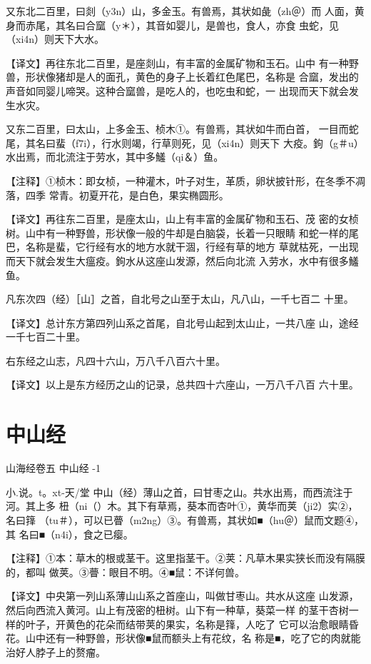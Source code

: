 \documentclass[a4paper,12pt,UTF8,twoside]{ctexbook}
\begin{document}
又东北二百里，曰剡（y3n）山，多金玉。有兽焉，其状如彘（zh＠）而 人面，黄身而赤尾，其名曰合窳（y＊），其音如婴儿，是兽也，食人，亦食 虫蛇，见（xi4n）则天下大水。

【译文】再往东北二百里，是座剡山，有丰富的金属矿物和玉石。山中 有一种野兽，形状像猪却是人的面孔，黄色的身子上长着红色尾巴，名称是 合窳，发出的声音如同婴儿啼哭。这种合窳兽，是吃人的，也吃虫和蛇，一 出现而天下就会发生水灾。

又东二百里，曰太山，上多金玉、桢木①。有兽焉，其状如牛而白首， 一目而蛇尾，其名曰蜚（f7i），行水则竭，行草则死，见（xi4n）则天下 大疫。鉤（g＃u）水出焉，而北流注于劳水，其中多鱃（qi＆）鱼。

【注释】①桢木：即女桢，一种灌木，叶子对生，革质，卵状披针形，在冬季不凋落，四季 常青。初夏开花，是白色，果实椭圆形。

【译文】再往东二百里，是座太山，山上有丰富的金属矿物和玉石、茂 密的女桢树。山中有一种野兽，形状像一般的牛却是白脑袋，长着一只眼睛 和蛇一样的尾巴，名称是蜚，它行经有水的地方水就干涸，行经有草的地方 草就枯死，一出现而天下就会发生大瘟疫。鉤水从这座山发源，然后向北流 入劳水，水中有很多鱃鱼。

凡东次四（经）［山］之首，自北号之山至于太山，凡八山，一千七百二 十里。

【译文】总计东方第四列山系之首尾，自北号山起到太山止，一共八座 山，途经一千七百二十里。

右东经之山志，凡四十六山，万八千八百六十里。

【译文】以上是东方经历之山的记录，总共四十六座山，一万八千八百 六十里。

\chapter{中山经}

山海经卷五 中山经 -1

小.说。t。xt-天/堂
中山（经）薄山之首，曰甘枣之山。共水出焉，而西流注于河。其上多 杻（ni（）木。其下有草焉，葵本而杏叶①，黄华而荚（ji2）实②，名曰箨 （tu＃），可以已瞢（m2ng）③。有兽焉，其状如■（hu＠）鼠而文题④，其 名曰■（n4i），食之已瘿。

【注释】①本：草木的根或茎干。这里指茎干。②荚：凡草木果实狭长而没有隔膜的，都叫 做荚。③瞢：眼目不明。④■鼠：不详何兽。

【译文】中央第一列山系薄山山系之首座山，叫做甘枣山。共水从这座 山发源，然后向西流入黄河。山上有茂密的杻树。山下有一种草，葵菜一样 的茎干杏树一样的叶子，开黄色的花朵而结带荚的果实，名称是箨，人吃了 它可以治愈眼睛昏花。山中还有一种野兽，形状像■鼠而额头上有花纹，名 称是■，吃了它的肉就能治好人脖子上的赘瘤。
\end{document}
